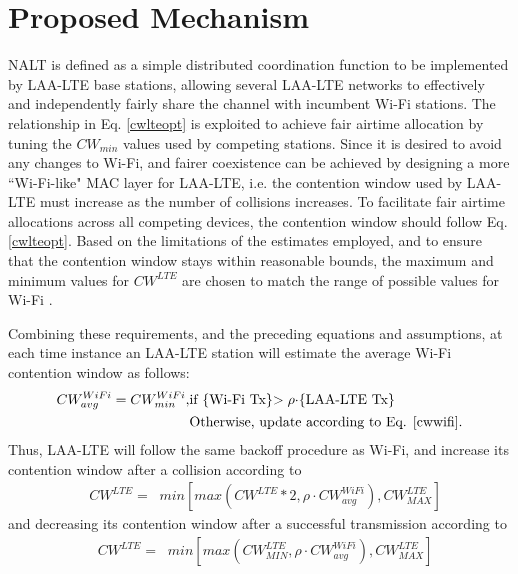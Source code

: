 \section{Proposed Mechanism}
\label{proposed}
NALT is defined as a simple distributed coordination function to be implemented by LAA-LTE base stations, allowing several LAA-LTE networks to effectively and independently fairly share the channel with incumbent Wi-Fi stations. The relationship in Eq. \ref{cwlteopt} is exploited to achieve fair airtime allocation by tuning the $CW_{min}$ values used by competing stations.  Since it is desired to avoid any changes to \mbox{Wi-Fi}, and fairer coexistence can be achieved by designing a more \mbox{``\mbox{Wi-Fi}-like"} MAC layer for \mbox{LAA-LTE}, i.e. the contention window used by \mbox{LAA-LTE} must increase as the number of collisions increases.  To facilitate fair airtime allocations across all competing devices, the contention window should follow Eq. \ref{cwlteopt}.  Based on the limitations of the estimates employed, and to ensure that the contention window stays within reasonable bounds, the maximum and minimum values for $CW^{LTE}$ are chosen to match the range of possible values for \mbox{Wi-Fi} \cite{80211}.  

Combining these requirements, and the preceding equations and assumptions, at each time instance an \mbox{LAA-LTE} station will estimate the average \mbox{Wi-Fi} contention window as follows:
\begin{align*}
CW^{WiFi}_{avg} = CW^{WiFi}_{min}, &\text{if \{\mbox{Wi-Fi} Tx\}$> \rho\cdot$\{\mbox{LAA-LTE} Tx\}}\\ 
&\text{Otherwise, update according to Eq. \ref{cwwifi}.}
\end{align*}
Thus, \mbox{LAA-LTE} will follow the same backoff procedure as \mbox{Wi-Fi}, and increase its contention window after a collision according to
\begin{align}
&CW^{LTE}=\;\;min\left[max\left(CW^{LTE}*2,\rho \cdot CW^{WiFi}_{avg}\right), CW^{LTE}_{MAX}\right]
\end{align}
and decreasing its contention window after a successful transmission according to 
\begin{align}
&CW^{LTE}=\;\;min\left[max\left(CW^{LTE}_{MIN},\rho \cdot CW^{WiFi}_{avg}\right), CW^{LTE}_{MAX}\right]
\end{align}

